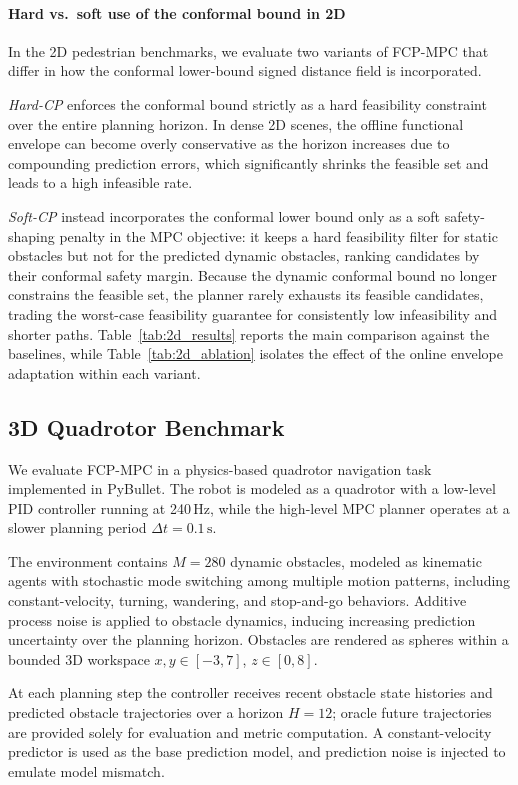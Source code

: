 \documentclass[lettersize,journal]{IEEEtran}
\begin{document}
\paragraph{Hard vs.\ soft use of the conformal bound in 2D}
In the 2D pedestrian benchmarks, we evaluate two variants of FCP-MPC that differ
in how the conformal lower-bound signed distance field is incorporated.

\emph{Hard-CP} enforces the conformal bound strictly as a hard feasibility
constraint over the entire planning horizon.
In dense 2D scenes, the offline functional envelope can become overly conservative
as the horizon increases due to compounding prediction errors, which significantly
shrinks the feasible set and leads to a high infeasible rate.

\emph{Soft-CP} instead incorporates the conformal lower bound only as a soft
safety-shaping penalty in the MPC objective: it keeps a hard feasibility filter for
static obstacles but not for the predicted dynamic obstacles, ranking candidates by
their conformal safety margin.
Because the dynamic conformal bound no longer constrains the feasible set, the planner
rarely exhausts its feasible candidates, trading the worst-case feasibility guarantee
for consistently low infeasibility and shorter paths.
Table~\ref{tab:2d_results} reports the main comparison against the baselines, while
Table~\ref{tab:2d_ablation} isolates the effect of the online envelope adaptation
within each variant.


\subsection{3D Quadrotor Benchmark}
We evaluate FCP-MPC in a physics-based quadrotor navigation task
implemented in PyBullet.
The robot is modeled as a quadrotor with a low-level PID controller running at
240\,Hz, while the high-level MPC planner operates at a slower planning period
$\Delta t = 0.1\,\mathrm{s}$.

The environment contains $M = 280$ dynamic obstacles, modeled as kinematic agents
with stochastic mode switching among multiple motion patterns, including
constant-velocity, turning, wandering, and stop-and-go behaviors.
Additive process noise is applied to obstacle dynamics, inducing increasing
prediction uncertainty over the planning horizon.
Obstacles are rendered as spheres within a bounded 3D workspace
$x,y \in [-3,7]$, $z \in [0,8]$.

At each planning step the controller receives recent obstacle state histories and
predicted obstacle trajectories over a horizon $H = 12$; oracle future trajectories
are provided solely for evaluation and metric computation.
A constant-velocity predictor is used as the base prediction model, and prediction
noise is injected to emulate model mismatch.
\end{document}
